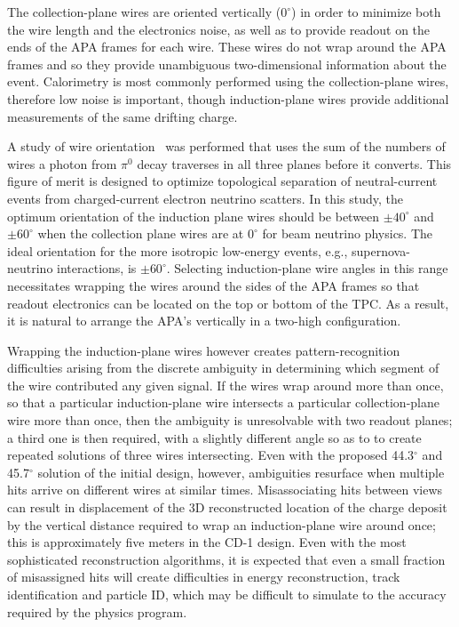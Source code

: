 The collection-plane wires are oriented vertically ($0^\circ$) in
order to minimize both the wire length and the electronics noise,
as well as to provide readout on the ends of the APA frames for
each wire.  These wires do not wrap around the APA frames and so
they provide unambiguous two-dimensional information about the
event.  Calorimetry is most commonly performed using the
collection-plane wires, therefore low noise is important, though
induction-plane wires provide additional measurements of the same
drifting charge.


A study of wire orientation~\cite{docdb2836} was performed that uses
the sum of the numbers of wires a photon from $\pi^0$ decay traverses
in all three planes before it converts.  This figure of merit is
designed to optimize topological separation of neutral-current events
from charged-current electron neutrino scatters.  In this study, the
optimum orientation of the induction plane wires should be between
$\pm40^\circ$ and $\pm60^\circ$ when the collection plane wires are at
$0^\circ$ for beam neutrino physics. The ideal orientation for the
more isotropic low-energy events, e.g., supernova-neutrino
interactions, is $\pm60^\circ$.  Selecting induction-plane wire angles
in this range necessitates wrapping the wires around the sides of the
APA frames so that readout electronics can be located on the top or
bottom of the TPC.  As a result, it is natural to arrange the APA's
vertically in a two-high configuration.

Wrapping the induction-plane wires however creates pattern-recognition
difficulties arising from the discrete ambiguity in determining which segment of
the wire contributed any given signal.  If the wires wrap around more
than once, so that a particular induction-plane wire intersects a
particular collection-plane wire more than once, then the ambiguity is
unresolvable with two readout planes; a third one is then required, with
a slightly different angle so as to to create repeated solutions of
three wires intersecting.  Even with the proposed 44.3$^\circ$ and
45.7$^\circ$ solution of the initial design, however, ambiguities
resurface when multiple hits arrive on different wires at similar
times.  Misassociating hits between views can result in %
displacement of the 3D reconstructed location of the charge
deposit by the vertical distance required to wrap an induction-plane
wire around once; this is approximately five meters in the CD-1 design.
Even with the most sophisticated reconstruction algorithms, it is
expected that even a small fraction of misassigned hits will create
difficulties in energy reconstruction, track identification and
particle ID, which may be difficult to simulate to the accuracy
required by the physics program.


